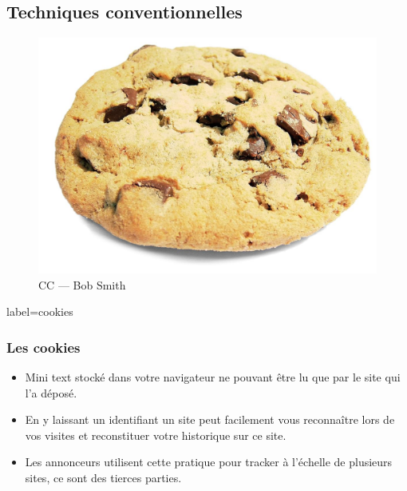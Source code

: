 \documentclass{beamer}
\begin{document}
    \subsection{Techniques conventionnelles}
        \begin{frame}
            \begin{center}
                \begin{figure}
                    \includegraphics[scale=0.15]{img/cookie.jpg}
                    \caption{CC --- Bob Smith}
                \end{figure}
            \end{center}
        \end{frame}
        \begin{frame}{label=cookies}
            \frametitle{Les cookies}
            \begin{center}
                \begin{itemize}
                    \item Mini text stocké dans votre navigateur ne pouvant être lu que par le site qui l'a déposé.
                    \item En y laissant un identifiant un site peut facilement vous reconnaître lors de vos visites et reconstituer votre historique sur ce site.
                    \item Les annonceurs utilisent cette pratique pour tracker à l'échelle de plusieurs sites, ce sont des tierces parties.
                \end{itemize}
            \end{center}
        \end{frame}
\end{document}
